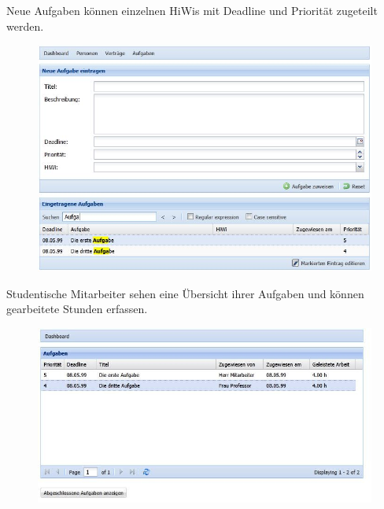 \documentclass[article,colorback,accentcolor=tud2c]{tudreport}
\begin{document}
\newpage

Neue Aufgaben können einzelnen HiWis mit Deadline und Priorität zugeteilt werden.

\begin{figure}[h]
    \begin{center}
        \includegraphics[scale=0.7]{img/mitarbeiter-aufgaben}
    \end{center}
\end{figure}

Studentische Mitarbeiter sehen eine Übersicht ihrer Aufgaben und können gearbeitete Stunden erfassen.

\begin{figure}[h]
    \begin{center}
        \includegraphics[scale=0.7]{img/hiwi-dashboard}
    \end{center}
\end{figure}


\newpage
\end{document}

